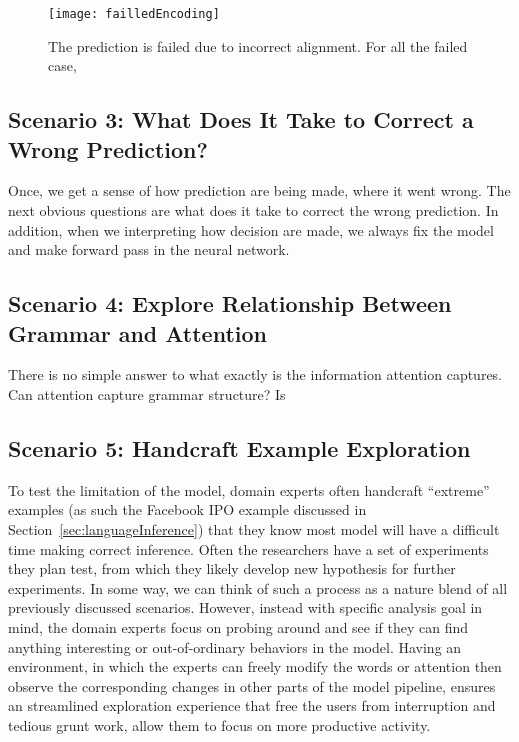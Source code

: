 



\begin{figure*}[t]
\centering
\vspace{-2mm}
 \texttt{[image: failledEncoding]}
 \caption{
The prediction is failed due to incorrect alignment. For all the failed case, 
 }
\label{fig:failedEncoding}
\end{figure*}



\subsection{Scenario 3: What Does It Take to Correct a Wrong Prediction?}
Once, we get a sense of how prediction are being made, where it went wrong. The next obvious questions are what does it take to correct the wrong prediction. 
In addition, when we interpreting how decision are made, we always fix the model and make forward pass in the neural network.

\subsection{Scenario 4: Explore Relationship Between Grammar and Attention}
There is no simple answer to what exactly is the information attention captures.
Can attention capture grammar structure? Is 

\subsection{Scenario 5: Handcraft Example Exploration}
To test the limitation of the model, domain experts often handcraft ``extreme'' examples (as such the Facebook IPO example discussed in Section~\ref{sec:languageInference}) that they know most model will have a difficult time making correct inference. 
%
Often the researchers have a set of experiments they plan test, from which they likely develop new hypothesis for further experiments.
%
In some way, we can think of such a process as a nature blend of all previously discussed scenarios. However,  instead with specific analysis goal in mind, the domain experts focus on probing around and see if they can find anything interesting or out-of-ordinary behaviors in the model.
%
Having an environment, in which the experts can freely modify the words or attention then observe the corresponding changes in other parts of the model pipeline, ensures an streamlined exploration experience that free the users from interruption and tedious grunt work, allow them to focus on more productive activity. 

